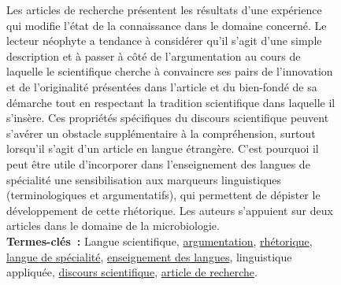 \begin{figure}
\begin{minipage}{\linewidth}
{{          \vspace{-0.5em}
          Les articles de recherche présentent les résultats d'une expérience
          qui modifie l'état de la connaissance dans le domaine concerné. Le
          lecteur néophyte a tendance à considérer qu'il s'agit d'une simple
          description et à passer à côté de l'argumentation au cours de laquelle
          le scientifique cherche à convaincre ses pairs de l'innovation et de
          l'originalité présentées dans l'article et du bien-fondé de sa
          démarche tout en respectant la tradition scientifique dans laquelle il
          s'insère. Ces propriétés spécifiques du discours scientifique peuvent
          s'avérer un obstacle supplémentaire à la compréhension, surtout
          lorsqu'il s'agit d'un article en langue étrangère. C'est pourquoi il
          peut être utile d'incorporer dans l'enseignement des langues de
          spécialité une sensibilisation aux marqueurs linguistiques
          (terminologiques et argumentatifs), qui permettent de dépister le
          développement de cette rhétorique. Les auteurs s'appuient sur deux
          articles dans le domaine de la microbiologie.\\

          \vspace{-0.5em}
          \textbf{Termes-clés~:} Langue scientifique,
          \underline{argumentation},  \underline{rhétorique},  \underline{langue
          de spécialité}, \underline{enseignement des langues}, linguistique
          appliquée,  \underline{discours scientifique},  \underline{article de
          recherche}.
        }
      }
      ~\\~\\
\end{minipage}
\end{figure}

